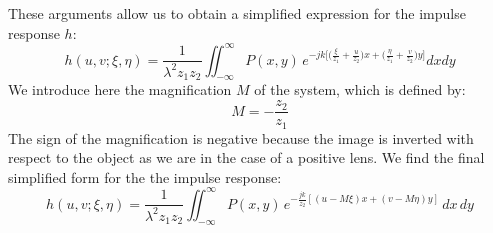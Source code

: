 \documentclass{article}
\begin{document}
These arguments allow us to obtain a simplified expression for the impulse response $h$:
\begin{equation}
    h(u,v; \xi, \eta) = \frac{1}{\lambda^2 z_1 z_2}
    \iint_{-\infty}^{\infty}  P(x,y) \, e^{-jk\big[\big(\frac{\xi}{z_1} + \frac{u}{z_2}\big)x + \big(\frac{\eta}{z_1} + \frac{v}{z_2}\big)y\big]} 
    dx dy  
\end{equation}
We introduce here the magnification $M$ of the system, which is defined by:
\begin{equation}
    M = -\frac{z_2}{z_1}
\end{equation}
The sign of the magnification is negative because the image is inverted with respect to the object as we are in the case of a positive lens. We find the final simplified form for the the impulse response:
\begin{equation}\label{eq:impulse_response_lens_simplified}
    h(u,v; \xi, \eta) = \frac{1}{\lambda^2 z_1 z_2} \iint_{-\infty}^{\infty} P(x,y) \, e^{-\frac{j k}{z_2} \left[(u-M\xi)x + (v-M\eta)y \right]} \, dx \, dy
\end{equation}
\end{document}
